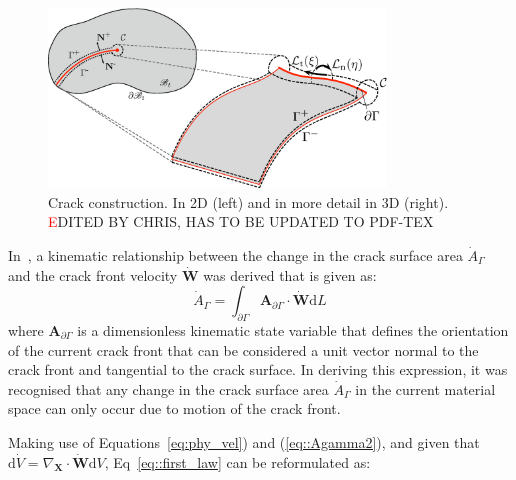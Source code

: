 \documentclass[review]{elsarticle}
\numberwithin{equation}{section}
\begin{document}
\begin{figure}[th]
\setlength{\fboxsep}{0pt}%
\setlength{\fboxrule}{0pt}%
\begin{center}
\includegraphics[width=0.8\textwidth]{Figures/crack3.eps}
\end{center}
\caption{Crack construction. In 2D (left) and in more detail in 3D (right).\label{F2} \textcolor{red} EDITED BY CHRIS, HAS TO BE UPDATED TO PDF-TEX}
\end{figure}

In~\citep{kaczmarczyk2017energy}, a kinematic relationship between the change in the
crack surface area $\dot{A}_\Gamma$ and the crack front velocity $\dot{\mathbf{W}}$ was derived that is given as:
\begin{equation}
\label{eq::Agamma2}
\dot{A}_\Gamma
 =
\int_{\partial\Gamma}
\mathbf{A}_{\partial\Gamma} \cdot \dot{\mathbf{W}} \textrm{d}L
\end{equation}
where 
$\mathbf{A}_{\partial\Gamma}$ is a dimensionless kinematic state variable that defines the orientation of the current crack front that can be considered a unit vector normal to the crack front and tangential to the crack surface. In deriving this expression, it was recognised that any change in the crack surface area $\dot{A}_\Gamma$ in the current material space can only occur due to motion of the crack front.

Making use of Equations~\ref{eq:phy_vel}) and (\ref{eq::Agamma2}),
and given that $\mathrm d \dot V = \nabla _{\mathbf X} \cdot \mathbf{\dot W}
\mathrm d V$, Eq~\ref{eq::first_law} can be reformulated as:
\end{document}

